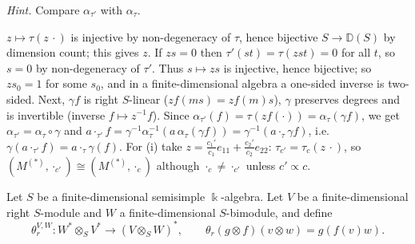 \documentclass[11pt,a4paper]{exam}
\newcommand{\kk}{\Bbbk}
\newcommand{\bbD}{\mathbb D}
\newcommand{\grstar}{(*)}
\begin{document}
\begin{questions}
\begin{parts}
\begin{subparts}
\emph{Hint.} Compare $\alpha_{\tau'}$ with $\alpha_\tau$.
\begin{solution}
$z\mapsto\tau(z\,\cdot)$ is injective by non-degeneracy of $\tau$, hence bijective $S\to\bbD(S)$ by dimension count; this gives $z$.
If $zs=0$ then $\tau'(st)=\tau(zst)=0$ for all $t$, so $s=0$ by non-degeneracy of $\tau'$.
Thus $s\mapsto zs$ is injective, hence bijective; so $zs_0=1$ for some $s_0$, and in a finite-dimensional algebra a one-sided inverse is two-sided.
Next, $\gamma f$ is right $S$-linear ($zf(ms)=zf(m)s$), $\gamma$ preserves degrees and is invertible (inverse $f\mapsto z^{-1}f$).
Since $\alpha_{\tau'}(f)=\tau(zf(\cdot))=\alpha_\tau(\gamma f)$, we get $\alpha_{\tau'}=\alpha_\tau\circ\gamma$ and
$a\cdot_{\tau'}f=\gamma^{-1}\alpha_\tau^{-1}(a\,\alpha_\tau(\gamma f))=\gamma^{-1}(a\cdot_\tau\gamma f)$, i.e.\ $\gamma(a\cdot_{\tau'}f)=a\cdot_\tau\gamma(f)$.
For (i) take $z=\frac{c_1'}{c_1}e_{11}+\frac{c_2'}{c_2}e_{22}$: $\tau_{c'}=\tau_c(z\,\cdot)$, so $(M^{\grstar},\cdot_{c'})\cong(M^{\grstar},\cdot_c)$ although $\cdot_c\neq\cdot_{c'}$ unless $c'\propto c$.
\end{solution}
\end{subparts}
\end{parts}

\newpage
\titledquestion{}
Let $S$ be a finite-dimensional semisimple $\kk$-algebra. 
Let $V$ be a finite-dimensional right $S$-module and $W$ a finite-dimensional
$S$-bimodule, and define
\[
  \theta_r^{V,W}:W^*\otimes_SV^*\longrightarrow(V\otimes_SW)^*,\qquad
  \theta_r(g\otimes f)(v\otimes w)=g(f(v)w).
\]
\end{questions}
\end{document}
